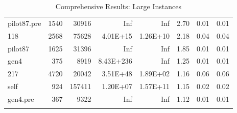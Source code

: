 \documentclass[10pt]{article}
\begin{document}
\begin{longtable}{|l|r|r|r|r|r|r|r|}
pilot87.pre	&	1540	&	30916	&	Inf	&	Inf	&	2.70	&	0.01	&	0.01	\\
118	&	2568	&	75628	&	4.01E+15	&	1.26E+10	&	2.18	&	0.04	&	0.04	\\
pilot87	&	1625	&	31396	&	Inf	&	Inf	&	1.85	&	0.01	&	0.01	\\
gen4	&	375	&	8919	&	8.43E+236	&	Inf	&	1.25	&	0.01	&	0.01	\\
217	&	4720	&	20042	&	3.51E+48	&	1.89E+02	&	1.16	&	0.06	&	0.06	\\
self	&	924	&	157411	&	1.20E+07	&	1.57E+11	&	1.15	&	0.02	&	0.02	\\
gen4.pre	&	367	&	9322	&	Inf	&	Inf	&	1.12	&	0.01	&	0.01	\\
\hline
\caption{Comprehensive Results: Large Instances}
\small
\centering
\label{supptab:all_large}
\end{longtable}
\end{document}
